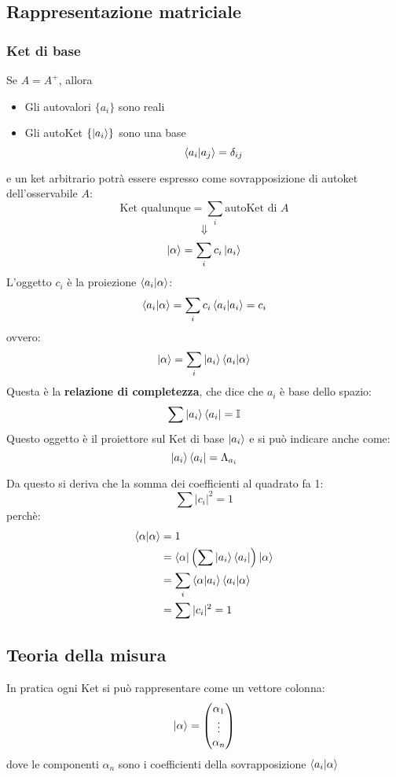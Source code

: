 \documentclass[a4paper]{article}
\begin{document}
\subsection{Rappresentazione matriciale}
\subsubsection{Ket di base}
Se \( A = A^+ \), allora
\begin{itemize}
  \item Gli autovalori \( \{a_i\} \) sono reali
  \item Gli autoKet \( \{\ket{a_i}\}  \) sono una base
    \[
      \braket{a_i}{a_j} = \delta_{ij}
    \] 
\end{itemize}
e un ket arbitrario potrà essere espresso come sovrapposizione di autoket dell'osservabile
\( A \):
\[
  \text{Ket qualunque} = \sum_i \text{autoKet di } A
\] 
\[
\Downarrow
\] 
\[
  \ket{\alpha} = \sum_i c_i \ket{a_i}
\] 
L'oggetto \( c_i \) è la proiezione \( \braket{a_i}{\alpha} \):
\[
  \braket{a_i}{\alpha} = \sum_i c_i \braket{a_i}{a_i} = c_i
\] 
ovvero:
\[
  \ket{\alpha} = \sum_i \ket{a_i} \braket{a_i}{\alpha}
\] 
Questa è la \textbf{relazione di completezza}, che dice che \( a_i \) è base dello spazio:
\[
  \sum \ket{a_i} \bra{a_i} = \mathbb{I}
\] 
Questo oggetto è il proiettore sul Ket di base \( \ket{a_i} \) e si può indicare anche
come:
\[
  \ket{a_i} \bra{a_i} = \Lambda_{a_i}
\] 

\vspace{1em}
\noindent
Da questo si deriva che la somma dei coefficienti al quadrato fa 1:
\[
  \sum |c_i|^2 = 1
\] 
perchè:
\[
  \begin{aligned}
    \braket{\alpha}{\alpha} &= 1\\
                            &=\bra{\alpha} \left( \sum \ket{a_i} \bra{a_i} \right) \ket{\alpha}\\
                            &= \sum_i \braket{\alpha}{a_i} \braket{a_i}{\alpha}\\
                            &= \sum |c_i|^2 = 1
  \end{aligned}
\] 

\subsection{Teoria della misura}
In pratica ogni Ket si può rappresentare come un vettore colonna:
\[
  \ket{\alpha} =
  \begin{pmatrix} 
    \alpha_1\\
    \vdots\\
    \alpha_n
  \end{pmatrix} 
\] 
dove le componenti \( \alpha_n \) sono i coefficienti della sovrapposizione \( \braket{a_i}{\alpha} \) 
\end{document}
